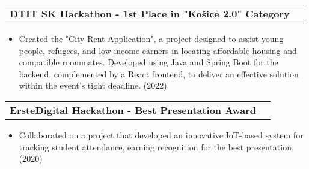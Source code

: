 \documentclass[letterpaper,11pt]{article}
\makeatletter
\newcommand{\resumeItem}[1]{
  \item\small{
    {#1 \vspace{-2pt}}
  }
}
\newcommand{\resumeProjectHeading}[2]{
    \vspace{-2pt}\item
    \begin{tabular*}{0.97\textwidth}{l@{\extracolsep{\fill}}r}
      \small#1 & #2 \\
    \end{tabular*}\vspace{-7pt}
}
\newcommand{\resumeItemListStart}{\begin{itemize}}
\newcommand{\resumeItemListEnd}{\end{itemize}\vspace{-5pt}}
\makeatother
\begin{document}
    \resumeProjectHeading    
    {\textbf{DTIT SK Hackathon - 1st Place in "Košice 2.0" Category} }{}
    \resumeItemListStart[label={}]
    \resumeItem{Created the "City Rent Application", a project designed to assist young people, refugees, and low-income earners in locating affordable housing and compatible roommates. Developed using Java and Spring Boot for the backend, complemented by a React frontend, to deliver an effective solution within the event's tight deadline. (2022)} \\ \vspace{3pt}
    \resumeItemListEnd 

\resumeProjectHeading    
{\textbf{ErsteDigital Hackathon - Best Presentation Award} }{}
\resumeItemListStart[label={}]
\resumeItem{Collaborated on a project that developed an innovative IoT-based system for tracking student attendance, earning recognition for the best presentation. (2020)} \\ \vspace{3pt}
\resumeItemListEnd 

    
        
        
        
    
\end{document}
